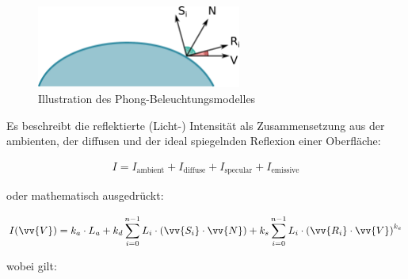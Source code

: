 \begin{figure}[H]
    \centering
    \includegraphics[width=0.6\textwidth]{img/phong_illumination_model.pdf}
    \caption{Illustration des Phong-Beleuchtungsmodelles\protect\footnotemark}\label{fig:phong_illustration}
\end{figure}

Es beschreibt die reflektierte (Licht-) Intensität als Zusammensetzung aus der ambienten, der diffusen und der ideal spiegelnden Reflexion einer Oberfläche:

\begin{gather}
    I = I_{\text{ambient}} + I_{\text{diffuse}} + I_{\text{specular}} + I_{\text{emissive}}
\end{gather}

oder mathematisch ausgedrückt:

\begin{gather}
    I(\vv{V}) = k_{a} \cdot L_{a} +
                k_{d} \displaystyle\sum_{i=0}^{n - 1} L_{i} \cdot (\vv{S_{i}} \cdot \vv{N}) +
                k_{s} \displaystyle\sum_{i=0}^{n - 1} L_{i} \cdot {(\vv{R_{i}} \cdot \vv{V})}^{k_{e}}
\end{gather}

wobei gilt:

